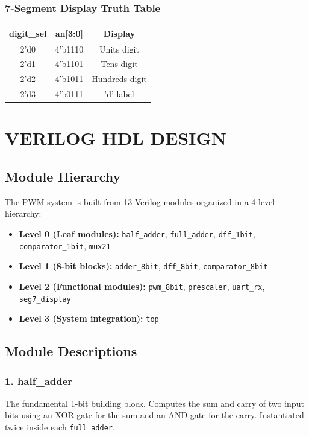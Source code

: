 \documentclass[12pt,a4paper]{article}
\begin{document}
\subsubsection*{7-Segment Display Truth Table}
\begin{center}
\begin{tabular}{|c|c|c|}
\hline
\textbf{digit\_sel} & \textbf{an[3:0]} & \textbf{Display} \\
\hline
2'd0 & 4'b1110 & Units digit \\
\hline
2'd1 & 4'b1101 & Tens digit \\
\hline
2'd2 & 4'b1011 & Hundreds digit \\
\hline
2'd3 & 4'b0111 & 'd' label \\
\hline
\end{tabular}
\end{center}

\section{VERILOG HDL DESIGN}

\subsection{Module Hierarchy}
The PWM system is built from 13 Verilog modules organized in a 4-level hierarchy:

\begin{itemize}
\item \textbf{Level 0 (Leaf modules):} \texttt{half\_adder}, \texttt{full\_adder}, \texttt{dff\_1bit}, \texttt{comparator\_1bit}, \texttt{mux21}
\item \textbf{Level 1 (8-bit blocks):} \texttt{adder\_8bit}, \texttt{dff\_8bit}, \texttt{comparator\_8bit}
\item \textbf{Level 2 (Functional modules):} \texttt{pwm\_8bit}, \texttt{prescaler}, \texttt{uart\_rx}, \texttt{seg7\_display}
\item \textbf{Level 3 (System integration):} \texttt{top}
\end{itemize}

\subsection{Module Descriptions}

\subsubsection*{1. half\_adder}
The fundamental 1-bit building block. Computes the sum and carry of two input bits using an XOR gate for the sum and an AND gate for the carry. Instantiated twice inside each \texttt{full\_adder}.
\end{document}
